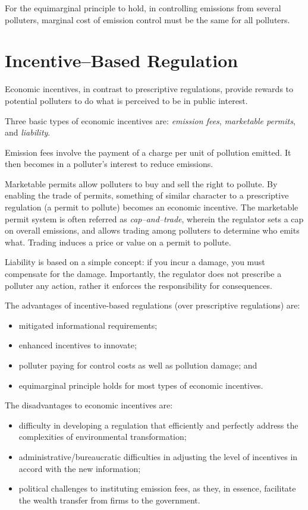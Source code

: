 \documentclass[
]{book}
\providecommand{\tightlist}{%
  \setlength{\itemsep}{0pt}\setlength{\parskip}{0pt}}
\begin{document}
For the equimarginal principle to hold, in controlling emissions from several polluters, marginal cost of emission control must be the same for all polluters.

\hypertarget{incentivebased-regulation}{%
\section{Incentive--Based Regulation}\label{incentivebased-regulation}}

Economic incentives, in contrast to prescriptive regulations, provide rewards to potential polluters to do what is perceived to be in public interest.

Three basic types of economic incentives are: \emph{emission fees}, \emph{marketable permits}, and \emph{liability}.

Emission fees involve the payment of a charge per unit of pollution emitted. It then becomes in a polluter's interest to reduce emissions.

Marketable permits allow polluters to buy and sell the right to pollute. By enabling the trade of permits, something of similar character to a prescriptive regulation (a permit to pollute) becomes an economic incentive. The marketable permit system is often referred as \emph{cap--and--trade}, wherein the regulator sets a cap on overall emissions, and allows trading among polluters to determine who emits what. Trading induces a price or value on a permit to pollute.

Liability is based on a simple concept: if you incur a damage, you must compensate for the damage. Importantly, the regulator does not prescribe a polluter any action, rather it enforces the responsibility for consequences.

The advantages of incentive-based regulations (over prescriptive regulations) are:

\begin{itemize}
\tightlist
\item
  mitigated informational requirements;
\item
  enhanced incentives to innovate;
\item
  polluter paying for control costs as well as pollution damage; and
\item
  equimarginal principle holds for most types of economic incentives.
\end{itemize}

The disadvantages to economic incentives are:

\begin{itemize}
\tightlist
\item
  difficulty in developing a regulation that efficiently and perfectly address the complexities of environmental transformation;
\item
  administrative/bureaucratic difficulties in adjusting the level of incentives in accord with the new information;
\item
  political challenges to instituting emission fees, as they, in essence, facilitate the wealth transfer from firms to the government.
\end{itemize}
\end{document}
